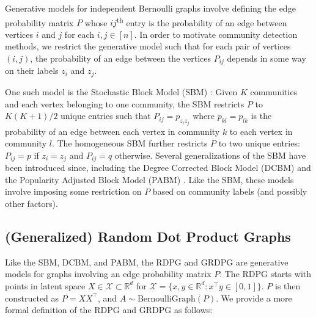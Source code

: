 \documentclass[
  11pt,
]{article}
\begin{document}
Generative models for independent Bernoulli graphs involve defining the
edge probability matrix \(P\) whose \(ij\)\textsuperscript{th} entry is
the probability of an edge between vertices \(i\) and \(j\) for each
\(i, j \in [n]\). In order to motivate community detection methods, we
restrict the generative model such that for each pair of vertices
\((i, j)\), the probability of an edge between the vertices \(P_{ij}\)
depends in some way on their labels \(z_i\) and \(z_j\).

One such model is the Stochastic Block Model (SBM)
\cite{doi:10.1080/0022250X.1971.9989788}: Given \(K\) communities and
each vertex belonging to one community, the SBM restricts \(P\) to
\(K (K + 1) / 2\) unique entries such that \(P_{ij} = p_{z_i z_j}\)
where \(p_{kl} = p_{lk}\) is the probability of an edge between each
vertex in community \(k\) to each vertex in community \(l\). The
homogeneous SBM further restricts \(P\) to two unique entries:
\(P_{ij} = p\) if \(z_i = z_j\) and \(P_{ij} = q\) otherwise. Several
generalizations of the SBM have been introduced since, including the
Degree Corrected Block Model (DCBM) \cite{Karrer_2011} and the
Popularity Adjusted Block Model (PABM)
\cite{307cbeb9b1be48299388437423d94bf1}. Like the SBM, these models
involve imposing some restriction on \(P\) based on community labels
(and possibly other factors).

\hypertarget{generalized-random-dot-product-graphs}{%
\subsection{(Generalized) Random Dot Product
Graphs}\label{generalized-random-dot-product-graphs}}

Like the SBM, DCBM, and PABM, the RDPG and GRDPG are generative models
for graphs involving an edge probability matrix \(P\). The RDPG starts
with points in latent space \(X \in \mathcal{X} \subset \mathbb{R}^d\)
for \(\mathcal{X} = \{x, y \in \mathbb{R}^d : x^\top y \in [0, 1]\}\).
\(P\) is then constructed as \(P = X X^\top\), and
\(A \sim \text{BernoulliGraph}(P)\). We provide a more formal definition
of the RDPG and GRDPG as follows:
\end{document}
